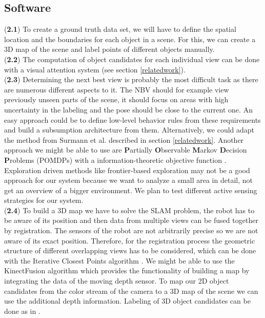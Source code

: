 \documentclass[a4paper,11pt,english]{article}
\begin{document}
\subsection{Software}
(\textbf{2.1}) To create a ground truth data set, we will have to define the spatial location and the boundaries for each object in a scene.
For this, we can create a 3D map of the scene and label points of different objects manually.\\
(\textbf{2.2}) The computation of object candidates for each individual view can be done with a visual attention system \cite{garcia2013computational} (see section \ref{relatedwork}).\\
(\textbf{2.3}) Determining the next best view is probably the most difficult task as there are numerous different aspects to it.
The NBV should for example view previously unseen parts of the scene, it should focus on areas with high uncertainty in the labeling and the pose should be close to the current one.
An easy approach could be to define low-level behavior rules from these requirements and build a subsumption architecture \cite{brooks1986robust} from them.
Alternatively, we could adapt the method from Surmann et al. \cite{surmann2003autonomous} described in section \ref{relatedwork}.
Another approach we might be able to use are \textbf{P}artially \textbf{O}bservable \textbf{M}arkov \textbf{D}ecision \textbf{P}roblems (POMDPs) with a information-theoretic objective function \cite{lauri2015planning}.
Exploration driven methods like frontier-based exploration may not be a good approach for our system because we want to analyze a small area in detail, not get an overview of a bigger environment.
We plan to test different active sensing strategies for our system.\\
(\textbf{2.4}) To build a 3D map we have to solve the SLAM problem, the robot has to be aware of its position and then data from multiple views can be fused together by registration.
The sensors of the robot are not arbitrarily precise so we are not aware of its exact position. Therefore, for the registration process the geometric structure of different overlapping views has to be considered, which can be done with the Iterative Closest Points algorithm \cite{surmann2003autonomous}.
We might be able to use the KinectFusion algorithm which provides the functionality of building a map by integrating the data of the moving depth sensor.
To map our 2D object candidates from the color stream of the camera to a 3D map of the scene we can use the additional depth information.
Labeling of 3D object candidates can be done as in \cite{garcia2013computational}.
\end{document}
